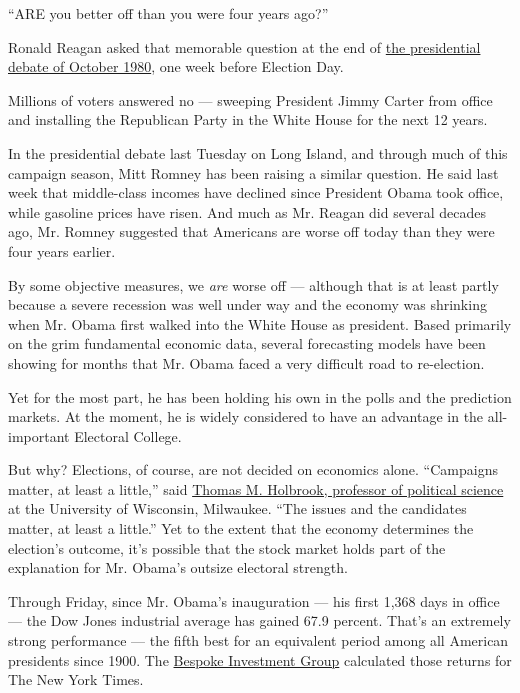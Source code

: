 ``ARE you better off than you were four years ago?''

Ronald Reagan asked that memorable question at the end of
\href{http://www.youtube.com/watch?v=kXFEh4cdCog\&feature=related}{the
presidential debate of October 1980}, one week before Election Day.

Millions of voters answered no --- sweeping President Jimmy Carter from
office and installing the Republican Party in the White House for the
next 12 years.

In the presidential debate last Tuesday on Long Island, and through much
of this campaign season, Mitt Romney has been raising a similar
question. He said last week that middle-class incomes have declined
since President Obama took office, while gasoline prices have risen. And
much as Mr. Reagan did several decades ago, Mr. Romney suggested that
Americans are worse off today than they were four years earlier.

By some objective measures, we \emph{are} worse off --- although that is
at least partly because a severe recession was well under way and the
economy was shrinking when Mr. Obama first walked into the White House
as president. Based primarily on the grim fundamental economic data,
several forecasting models have been showing for months that Mr. Obama
faced a very difficult road to re-election.

Yet for the most part, he has been holding his own in the polls and the
prediction markets. At the moment, he is widely considered to have an
advantage in the all-important Electoral College.

But why? Elections, of course, are not decided on economics alone.
``Campaigns matter, at least a little,'' said
\href{http://www4.uwm.edu/letsci/polisci/faculty/holbrook.cfm}{Thomas M.
Holbrook, professor of political science} at the University of
Wisconsin, Milwaukee. ``The issues and the candidates matter, at least a
little.'' Yet to the extent that the economy determines the election's
outcome, it's possible that the stock market holds part of the
explanation for Mr. Obama's outsize electoral strength.

Through Friday, since Mr. Obama's inauguration --- his first 1,368 days
in office --- the Dow Jones industrial average has gained 67.9 percent.
That's an extremely strong performance --- the fifth best for an
equivalent period among all American presidents since 1900. The
\href{http://www.bespokeinvest.com/}{Bespoke Investment Group}
calculated those returns for The New York Times.

